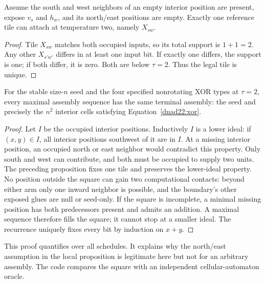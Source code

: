 

\begin{proposition}
Assume the south and west neighbors of an empty interior position are present,
expose $v_s$ and $h_w$, and its north/east positions are empty.
Exactly one reference tile can attach
at temperature two, namely $X_{sw}$.
\end{proposition}
\begin{proof}
Tile $X_{sw}$ matches both occupied inputs, so its total support is $1+1=2$.
Any other $X_{s'w'}$ differs in at least one input bit. If exactly one differs,
the support is one; if both differ, it is zero. Both are below $\tau=2$.
Thus the legal tile is unique.
\end{proof}

\begin{proposition}
For the stable size-$n$ seed and the four specified nonrotating XOR types at
$\tau=2$, every maximal assembly sequence has the same terminal assembly:
the seed and precisely the $n^2$ interior cells satisfying
Equation~\ref{dnad22:xor}.
\end{proposition}
\begin{proof}
Let $I$ be the occupied interior positions. Inductively $I$ is a lower ideal:
if $(x,y)\in I$, all interior positions southwest of it are in $I$.
At a missing interior position, an occupied north or east neighbor would
contradict this property. Only south and west can contribute, and both
must be occupied to supply two units. The preceding proposition fixes
one tile and preserves the lower-ideal property. No position outside the
square can gain two computational contacts: beyond either arm only one
inward neighbor is possible, and the boundary's other exposed glues are null
or seed-only. If the square is incomplete, a minimal missing position has
both predecessors present and admits an addition. A maximal sequence
therefore fills the square; it cannot stop at a smaller ideal. The recurrence
uniquely fixes every bit by induction on $x+y$.
\end{proof}

This proof quantifies over all schedules. It explains why the north/east
assumption in the local proposition is legitimate here but not for an arbitrary
assembly. The code compares the square with an independent cellular-automaton oracle.

